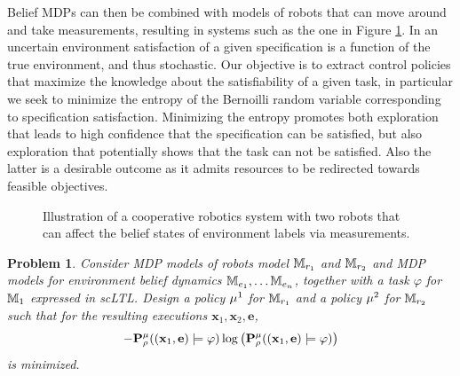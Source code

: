\documentclass[conference]{IEEEtran}
\newtheorem{problem}{Problem}
\begin{document}
Belief MDPs can then be combined with models of robots that can move around and take measurements, resulting in systems such as the one in Figure \ref{fig:robot-env}. In an uncertain environment satisfaction of a given specification is a function of the true environment, and thus stochastic. Our objective is to extract control policies that maximize the knowledge about the satisfiability of a given task, in particular we seek to minimize the entropy of the Bernoilli random variable corresponding to specification satisfaction. Minimizing the entropy promotes both exploration that leads to high confidence that the specification can be satisfied, but also exploration that potentially shows that the task can not be satisfied. Also the latter is a desirable outcome as it admits resources to be redirected towards feasible objectives.  
\begin{figure}
  \begin{center}
  \end{center}
  \caption{Illustration of a cooperative robotics system with two robots that can affect the belief states of environment labels via measurements.}
  \label{fig:robot-env}
\end{figure}

\begin{problem}
\label{prob:main}
  Consider MDP models of robots model $\mathbb{M}_{r_1}$ and $\mathbb{M}_{r_2}$ and MDP models for environment belief dynamics $\mathbb{M}_{e_1}, \ldots \mathbb{M}_{e_n}$, together with a task $\varphi$ for $\mathbb{M}_1$ expressed in scLTL. Design a policy $\mu^1$ for $\mathbb{M}_{r_1}$ and a policy $\mu^2$ for $\mathbb{M}_{r_2}$ such that for the resulting executions $\mathbf{x}_1, \mathbf{x}_2, \mathbf{e}$,
  \begin{equation}\label{eq:probstatement}
    - \Prob_\init^\pol ( (\mathbf{x}_1, \mathbf{e}) \models \varphi ) \log \left( \Prob_\init^\pol ( (\mathbf{x}_1, \mathbf{e}) \models \varphi ) \right)
  \end{equation}
  is minimized.
\end{problem}
\end{document}
